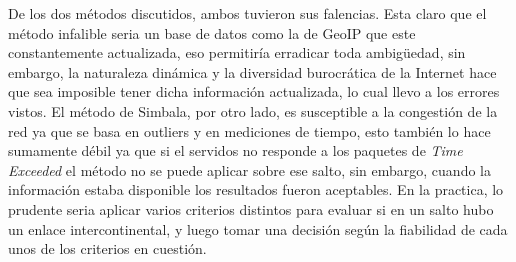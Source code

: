 
De los dos métodos discutidos, ambos tuvieron sus falencias. Esta claro que el método infalible seria un base de datos como la de GeoIP que este constantemente actualizada, eso permitiría erradicar toda ambigüedad, sin embargo, la naturaleza dinámica y la diversidad burocrática de la Internet hace que sea imposible tener dicha información actualizada, lo cual llevo a los errores vistos. El método de Simbala, por otro lado, es susceptible a la congestión de la red ya que se basa en outliers y en mediciones de tiempo, esto también lo hace sumamente débil ya que si el servidos no responde a los paquetes de \textit{Time Exceeded} el método no se puede aplicar sobre ese salto, sin embargo, cuando la información estaba disponible los resultados fueron aceptables. En la practica, lo prudente seria aplicar varios criterios distintos para evaluar si en un salto hubo un enlace intercontinental, y luego tomar una decisión según la fiabilidad de cada unos de los criterios en cuestión.


 

